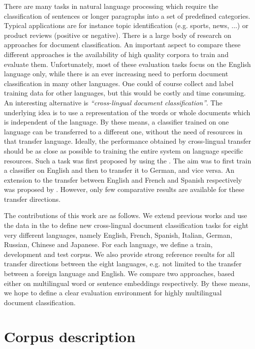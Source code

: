 \documentclass[10pt, a4paper]{article}
\begin{document}
There are many tasks in natural language processing which require the
classification of sentences or longer paragraphs into a set of predefined
categories.  Typical applications are for instance topic identification
(e.g. sports, news, $\ldots$) or product reviews (positive or negative).
There is a large body of research on approaches for document classification.
An important aspect to compare these different approaches is the availability
of high quality corpora to train and evaluate them.  Unfortunately, most of
these evaluation tasks focus on the English language only, while there is an
ever increasing need to perform document classification in many other
languages.  One could of course collect and label training data for other
languages, but this would be costly and time consuming.
An interesting alternative is \textit{``cross-lingual document
classification''}.  The underlying idea is to use a representation of the words
or whole documents which is independent of the language. By these means, a
classifier trained on one language can be transferred to a different one,
without the need of resources in that transfer language.  Ideally, the
performance obtained by cross-lingual transfer should be as close as possible to
training the entire system on language specific resources.
Such a task was first proposed by \cite{Klementiev:2012:coling_reuters} using
the \rcv{}.  The aim was to first train a classifier on English and then to transfer
it to German, and vice versa.  An extension to the transfer
between English and French and Spanish respectively was proposed by \cite{Mougadala:2016:naacl_biword}.
However, only few comparative results are available for these transfer directions.

The contributions of this work are as follows. We extend previous works and use
the data in the \rcv{} to
define new cross-lingual document classification tasks for eight very different
languages, namely English, French, Spanish, Italian, German, Russian, Chinese and Japanese.
For each language, we define a train, development and test
corpus.
We also provide strong reference results for all transfer directions between
the eight languages, e.g. not limited to the transfer between a foreign language
and English.
We compare two approaches, based either on multilingual word or sentence
embeddings respectively.  By these means, we hope to define a clear evaluation
environment for highly multilingual document classification.

\section{Corpus description}
\end{document}
